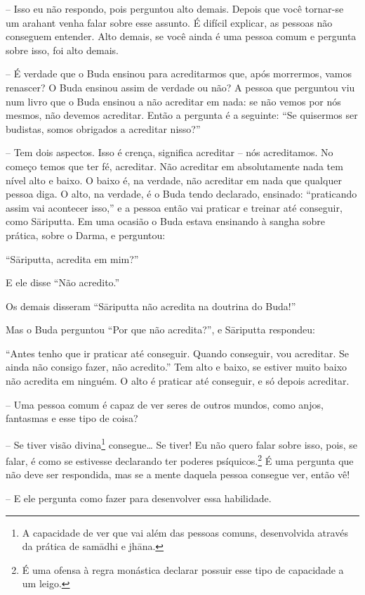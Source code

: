 -- Isso eu não respondo, pois perguntou alto demais. Depois que
você tornar-se um arahant venha falar sobre esse assunto. É difícil
explicar, as pessoas não conseguem entender. Alto demais, se você ainda
é uma pessoa comum e pergunta sobre isso, foi alto demais.

-- É verdade que o Buda ensinou para acreditarmos que, após
morrermos, vamos renascer? O Buda ensinou assim de verdade ou não? A
pessoa que perguntou viu num livro que o Buda ensinou a não acreditar
em nada: se não vemos por nós mesmos, não devemos acreditar. Então a
pergunta é a seguinte: “Se quisermos ser budistas, somos obrigados a
acreditar nisso?”

-- Tem dois aspectos. Isso é crença, significa acreditar – nós
acreditamos. No começo temos que ter fé, acreditar. Não acreditar em
absolutamente nada tem nível alto e baixo. O baixo é, na verdade, não
acreditar em nada que qualquer pessoa diga. O alto, na verdade, é o
Buda tendo declarado, ensinado: “praticando assim vai acontecer isso,”
e a pessoa então vai praticar e treinar até conseguir, como
Sāriputta. Em uma ocasião o Buda estava ensinando à sangha sobre
prática, sobre o Darma, e perguntou:

“Sāriputta, acredita em mim?” 

E ele disse “Não acredito.” 

Os demais disseram “Sāriputta não acredita na doutrina do Buda!”

Mas o Buda perguntou “Por que não acredita?”, e Sāriputta
respondeu:

“Antes tenho que ir praticar até conseguir. Quando conseguir, vou
acreditar. Se ainda não consigo fazer, não acredito.” Tem alto e baixo,
se estiver muito baixo não acredita em ninguém. O alto é praticar até
conseguir, e só depois acreditar.

-- Uma pessoa comum é capaz de ver seres de outros mundos, como
anjos, fantasmas e esse tipo de coisa?

-- Se tiver visão divina\footnote{A capacidade de ver que vai além
das pessoas comuns, desenvolvida através da prática de samādhi e
jhāna.} consegue… Se tiver! Eu não quero falar sobre isso, pois, se
falar, é como se estivesse declarando ter poderes psíquicos.\footnote{É
uma ofensa à regra monástica declarar possuir esse tipo de capacidade a
um leigo.} É uma pergunta que não deve ser respondida, mas se a mente
daquela pessoa consegue ver, então vê!

-- E ele pergunta como fazer para desenvolver essa habilidade.


